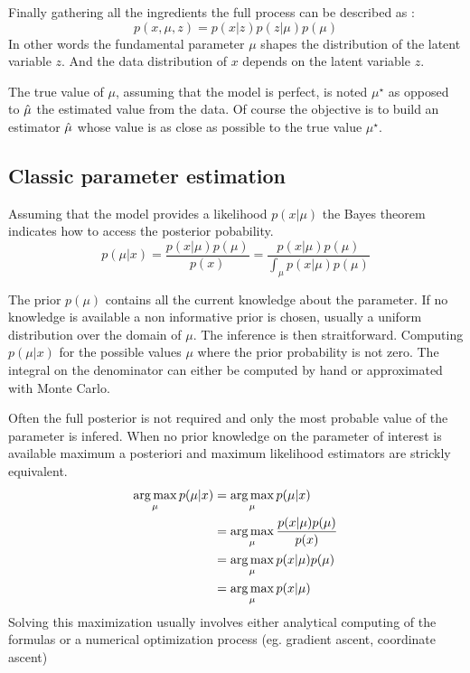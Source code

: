 Finally gathering all the ingredients the full process can be described as :
\begin{equation}
	\label{eq:model_simple}
	p(x, \mu, z) = p(x|z) p(z | \mu) p(\mu)
\end{equation}
In other words the fundamental parameter $\mu$ shapes the distribution of the latent variable $z$.
And the data distribution of $x$ depends on the latent variable $z$.

The true value of $\mu$, assuming that the model is perfect, is noted $\mu^\star$ as opposed to $\hat\mu$ the estimated value from the data.
Of course the objective is to build an estimator $\hat\mu$ whose value is as close as possible to the true value $\mu^\star$.







\subsection{Classic parameter estimation} %
\label{sub:classic_parameter_estimation}



Assuming that the model provides a likelihood $p(x | \mu)$ the Bayes theorem indicates how to access the posterior pobability.
\begin{equation}	
    p(\mu | x) = \frac{p(x|\mu) p(\mu)}{p(x)} = \frac{p(x|\mu) p(\mu)}{\int_\mu p(x|\mu) p(\mu)}
\end{equation}

The prior $p(\mu)$ contains all the current knowledge about the parameter. 
If no knowledge is available a non informative prior is chosen, usually a uniform distribution over the domain of $\mu$.
The inference is then straitforward.
Computing $p(\mu | x)$ for the possible values $\mu$ \ie where the prior probability is not zero.
The integral on the denominator can either be computed by hand or approximated with Monte Carlo.

Often the full posterior is not required and only the most probable value of the parameter is infered.
When no prior knowledge on the parameter of interest is available maximum a posteriori and maximum likelihood estimators are strickly equivalent.
\begin{align}
	\operatorname*{arg\,max}_\mu p(\mu | x) &= \operatorname*{arg\,max}_\mu p(\mu | x) \\
							&= \operatorname*{arg\,max}_\mu \frac{p(x|\mu) p(\mu)}{p(x)} \\
							&= \operatorname*{arg\,max}_\mu p(x|\mu) p(\mu) \\
							&= \operatorname*{arg\,max}_\mu p(x|\mu)\\
\end{align}
Solving this maximization usually involves either analytical computing of the formulas  or a numerical optimization process (eg. gradient ascent, coordinate ascent)








